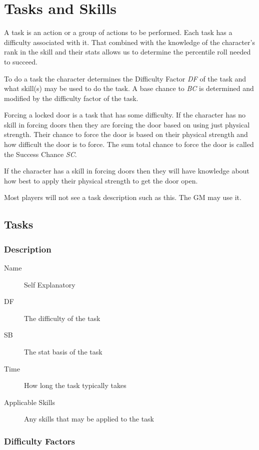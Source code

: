 \chapter{Tasks and Skills}

A task is an action or a group of actions to be performed. Each task has a 
difficulty associated with it. That combined with the knowledge of the character's 
rank in the skill and their stats allows us to determine the percentile roll needed 
to succeed.

To do a task the character determines the Difficulty Factor {\em DF} of the 
task and what skill(s) may be used to do the task. A base chance to 
{\em BC} is determined and modified by the difficulty factor 
of the task. 

Forcing a locked door is a task that has some difficulty. If the 
character has no skill in forcing doors then they are forcing the 
door based on using just physical strength. Their chance to force the 
door is based on their physical strength and how difficult the door 
is to force. The sum total chance to force the door is called the Success Chance {\em SC}.

If the character has a skill in forcing doors then they will have 
knowledge about how best to apply their physical strength to get the 
door open. 

Most players will not see a task description such as this. The GM may use
it.

\section{Tasks}

\subsection{Description}

\begin{description}
	\item[Name] 
	Self Explanatory
	\item[DF] The difficulty of the task
	\item[SB] The stat basis of the task
	\item[Time]
    How long the task typically takes
    \item[Applicable Skills]
    Any skills that may be applied to the task
\end{description}

\subsection{Difficulty Factors}

